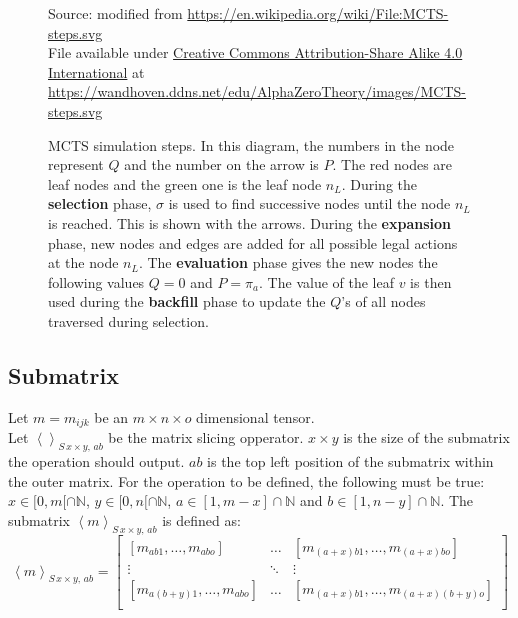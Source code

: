 \documentclass[12pt]{article}
\newcommand{\source}[1]{\caption*{Source: {#1}} }
\begin{document}
\begin{figure}
    \centering
	\captionsetup{width=.9\linewidth}
    
		\caption[width=0.7\columnwidth]{MCTS simulation steps. In this diagram, the numbers in the node represent \(Q\) and the number on the arrow is \(P\). The red nodes are leaf nodes and the green one is the leaf node \(n_L\). During the \textbf{selection} phase, \(\sigma\) is used to find successive nodes until the node \(n_L\) is reached. This is shown with the arrows. During the \textbf{expansion} phase, new nodes and edges are added for all possible legal actions at the node \(n_L\). The \textbf{evaluation} phase gives the new nodes the following values \(Q = 0\) and \(P = \pi_a\). The value of the leaf \(v\) is then used during the \textbf{backfill} phase to update the \(Q\)'s of all nodes traversed during selection.}
		\source{modified from \url{https://en.wikipedia.org/wiki/File:MCTS-steps.svg}\\File available under \href{https://creativecommons.org/licenses/by-sa/4.0/deed.en}{Creative Commons Attribution-Share Alike 4.0 International} at \url{https://wandhoven.ddns.net/edu/AlphaZeroTheory/images/MCTS-steps.svg}}
	\label{MCTS-simulation}
\end{figure}

\subsection{Submatrix}
\label{sec:Ref:submatrix}
Let \(m = m_{ijk}\) be an \(m\times n\times o\) dimensional tensor.\\
Let \(\left<\right>_{S\,x\times y,\,ab}\) be the matrix slicing opperator. \(x\times y\) is the size of the submatrix the operation should output. \(ab\) is the top left position of the submatrix within the outer matrix.  For the operation to be defined, the following must be true: \(x \in [0, m[\cap\mathbb N\), \(y \in [0, n[ \cap\mathbb N\), \(a  \in [1, m-x]\cap\mathbb N\) and \(b \in [1, n-y]\cap\mathbb N\). The submatrix \(\left<m\right>_{S\,x\times y,\,ab}\) is defined as:
\begin{equation}
\left<m\right>_{S\,x\times y,\,ab} = 
\left[
\begin{matrix}
[m_{ab1},\dots,m_{abo}] & \dots & [m_{(a+x)b1},\dots,m_{(a+x)bo}]\\
\vdots &  \ddots & \vdots\\
[m_{a(b+y)1},\dots,m_{abo}] & \dots & [m_{(a+x)b1},\dots,m_{(a+x)(b+y)o}]\\
\end{matrix}\right]
\end{equation}
\end{document}
